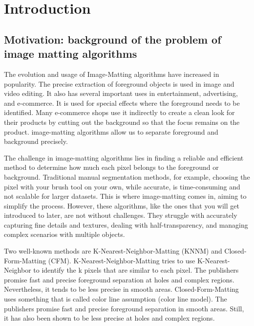 \section{Introduction}

\subsection{Motivation: background of the problem of image matting algorithms}
\label{sec:motivation}
The evolution and usage of Image-Matting algorithms have increased in popularity. The precise extraction of foreground objects is used in image and video editing. It also has several important uses in entertainment, advertising, and e-commerce. It is used for special effects where the foreground needs to be identified. Many e-commerce shops use it indirectly to create a clean look for their products by cutting out the background so that the focus remains on the product. 
image-matting algorithms allow us to separate foreground and background precisely.

The challenge in image-matting algorithms lies in finding a reliable and efficient method to determine how much each pixel belongs to the foreground or background. Traditional manual segmentation methods, for example, choosing the pixel with your brush tool on your own, while accurate, is time-consuming and not scalable for larger datasets. This is where image-matting comes in, aiming to simplify the process. However, these algorithms, like the ones that you will get introduced to later, are not without challenges. They struggle with accurately capturing fine details and textures, dealing with half-transparency, and managing complex scenarios with multiple objects.

Two well-known methods are K-Nearest-Neighbor-Matting (KNNM) and Closed-Form-Matting (CFM). 
K-Nearest-Neighbor-Matting \citep{knn}  tries to use K-Nearest-Neighbor to identify the k pixels that are similar to each pixel. The publishers promise fast and precise foreground separation at holes and complex regions. Nevertheless, it tends to be less precise in smooth areas.
Closed-Form-Matting \citep{cf} uses something that is called color line assumption (color line model). The publishers promise fast and precise foreground separation in smooth areas. Still, it has also been shown to be less precise at holes and complex regions. 

